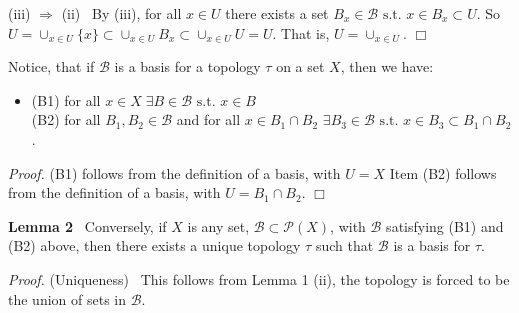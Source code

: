 \documentclass[12pt]{article}
\newcommand{\pset}[1]{ \mathcal{P}(#1) }
\newcommand{\st}[0]{ \textrm{ s.t. } }
\newcommand{\rimply}[0] { \Rightarrow }
\newcommand{\B}[0] { \mathcal{B} }
\begin{document}
\begin{flushleft}
\begin{flushleft}
 (iii) $\rimply$ (ii) \ By (iii), for all $x \in U$  there exists a set $B_x \in \B \st x \in B_x \subset U $.  So $U = \cup_{x \in U} \{x\} \subset \cup_{x \in U} B_x \subset \cup_{x \in U} U = U$.  That is,  $U = \cup_{x \in U}$. $ \Box$\end{flushleft}\end{flushleft}Notice, that if $\B$ is a basis for a topology $\tau$ on a set $X$, then we have:\begin{itemize}
\item[]
            (B1) for all $x \in X \; \exists B \in \B \st x \in B$ \\
            (B2) for all $B_1, B_2 \in \B$ and for all $x \in B_1 \cap B_2$ $\exists B_3 \in \B \st x \in B_3 \subset B_1 \cap B_2$.
        \end{itemize}\begin{flushleft}
 \emph{Proof.  } (B1) follows from the definition of a basis, with $U = X$
Item  (B2) follows from the definition of a basis, with $U = B_1 \cap B_2$.
$ \Box$  \end{flushleft}\begin{flushleft}
 { \bf Lemma 2 } \ Conversely, if $X$ is any set, $\B \subset \pset{X}$, with $\B$ satisfying (B1) and (B2) above, then there exists a unique topology $\tau$ such that $\B$ is a basis for $\tau$.\begin{flushleft}
 \emph{Proof.  }(Uniqueness) \ This follows from Lemma 1 (ii), the topology is forced to be the union of sets in $\B$. \\


\end{flushleft}
\end{flushleft}
\end{document}
